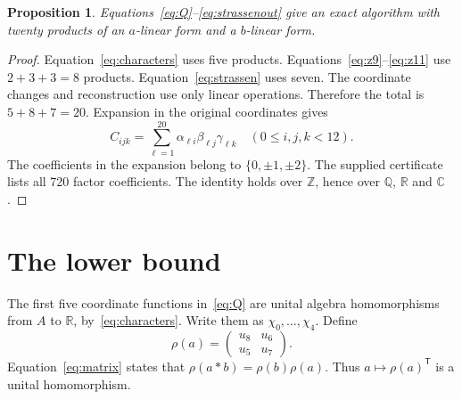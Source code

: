 \documentclass[11pt,a4paper]{article}
\newtheorem{proposition}[theorem]{Proposition}
\newcommand{\R}{\mathbb R}\newcommand{\Q}{\mathbb Q}
\newcommand{\Z}{\mathbb Z}\newcommand{\ind}{\mathbf1}
\begin{document}
\begin{proposition}\label{prop:upper}
Equations~\eqref{eq:Q}--\eqref{eq:strassenout} give an exact algorithm
with twenty products of an $a$-linear form and a $b$-linear form.
\end{proposition}
\begin{proof}
Equation~\eqref{eq:characters} uses five products.
Equations~\eqref{eq:z9}--\eqref{eq:z11} use $2+3+3=8$ products.
Equation~\eqref{eq:strassen} uses seven. The coordinate changes and
reconstruction use only linear operations. Therefore the total is
$5+8+7=20$. Expansion in the original coordinates gives
\begin{equation}\label{eq:certificate}
 C_{ijk}=\sum_{\ell=1}^{20}
 \alpha_{\ell i}\beta_{\ell j}\gamma_{\ell k}
 \quad(0\leq i,j,k<12).
\end{equation}
The coefficients in the expansion belong to $\{0,\pm1,\pm2\}$.
The supplied certificate lists all 720 factor coefficients.
The identity holds over $\Z$, hence over $\Q$, $\R$ and $\mathbb C$.
\end{proof}

\section{The lower bound}

The first five coordinate functions in~\eqref{eq:Q} are unital algebra
homomorphisms from $A$ to $\R$, by~\eqref{eq:characters}. Write them as
$\chi_0,\ldots,\chi_4$. Define
\begin{equation}\label{eq:rho}
 \rho(a)=\begin{pmatrix}u_8&u_6\\u_5&u_7\end{pmatrix}.
\end{equation}
Equation~\eqref{eq:matrix} states that $\rho(a*b)=\rho(b)\rho(a)$.
Thus $a\mapsto\rho(a)^{\mathsf T}$ is a unital homomorphism.
\end{document}
